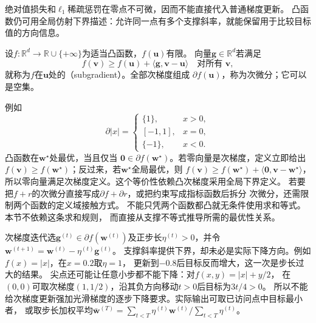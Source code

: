 绝对值损失和$\ell_1$稀疏惩罚在零点不可微，因而不能直接代入普通梯度更新。
凸函数仍可用全局仿射下界描述：允许同一点有多个支撑斜率，就能保留用于比较目标值的方向信息。
\begin{definition}[凸次梯度与次微分]
\label{def:opt-convex-subgradient}
设$f:\mathbb R^d\to\mathbb R\cup\{+\infty\}$为适当凸函数，$f(\bm u)$有限。
向量$\bm{g}\in\mathbb R^d$若满足
\[
  f(\bm{v})\geq f(\bm{u})+\langle\bm{g},\bm{v}-\bm{u}\rangle
  \quad\text{对所有 }\bm{v},
\]
就称为$f$在$\bm{u}$处的（subgradient）。全部次梯度组成
$\partial f(\bm{u})$，称为次微分；它可以是空集。
\end{definition}
例如
\[
  \partial |x|=
  \begin{cases}
    \{1\},&x>0,\\
    [-1,1],&x=0,\\
    \{-1\},&x<0.
  \end{cases}
\]
凸函数在$\bm{w}^{\star}$处最优，当且仅当
$\bm{0}\in\partial f(\bm{w}^{\star})$。若零向量是次梯度，定义立即给出
$f(\bm{v})\geq f(\bm{w}^{\star})$；反过来，若$\bm{w}^{\star}$全局最优，则
$f(\bm{v})\geq f(\bm{w}^{\star})+\langle\bm{0},\bm{v}-\bm{w}^{\star}\rangle$，
所以零向量满足次梯度定义。这个等价性依赖凸次梯度采用全局下界定义。
若要把$f+r$的次微分直接写成$\partial f+\partial r$，或把约束写成指标函数后拆分
次微分，还需限制两个函数的定义域接触方式。
不能只凭两个函数都凸就无条件使用求和等式。本节不依赖这条求和规则，
而直接从支撑不等式推导所需的最优性关系。

次梯度迭代选$\bm g^{(t)}\in\partial f(\bm w^{(t)})$及正步长$\eta^{(t)}>0$，并令
$\bm w^{(t+1)}=\bm w^{(t)}-\eta^{(t)}\bm g^{(t)}$。
支撑斜率提供下界，却未必是实际下降方向。例如$f(x)=|x|$，在$x=0.2$取$\eta=1$，
更新到$-0.8$后目标反而增大，这一次是步长过大的结果。
尖点还可能让任意小步都不能下降：对$f(x,y)=|x|+y/2$，
在$(0,0)$可取次梯度$(1,1/2)$，沿其负方向移动$t>0$后目标为$3t/4>0$。
所以不能给次梯度更新强加光滑梯度的逐步下降要求。实际输出可取已访问点中目标最小者，
或取步长加权平均$\bar{\bm w}^{(T)}=\sum_{t<T}\eta^{(t)}\bm w^{(t)}/\sum_{t<T}\eta^{(t)}$。

